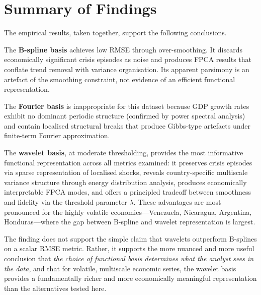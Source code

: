 \section{Summary of Findings}
\label{sec:summary}

The empirical results, taken together, support the following conclusions.

The \textbf{B-spline basis} achieves low RMSE through over-smoothing. It discards
economically significant crisis episodes as noise and produces FPCA results that
conflate trend removal with variance organisation. Its apparent parsimony is an
artefact of the smoothing constraint, not evidence of an efficient functional
representation.

The \textbf{Fourier basis} is inappropriate for this dataset because GDP growth
rates exhibit no dominant periodic structure (confirmed by power spectral
analysis) and contain localised structural breaks that produce Gibbs-type
artefacts under finite-term Fourier approximation.

The \textbf{wavelet basis}, at moderate thresholding, provides the most
informative functional representation across all metrics examined: it preserves
crisis episodes via sparse representation of localised shocks, reveals
country-specific multiscale variance structure through energy distribution
analysis, produces economically interpretable FPCA modes, and offers a principled
tradeoff between smoothness and fidelity via the threshold parameter $\lambda$.
These advantages are most pronounced for the highly volatile economies---Venezuela,
Nicaragua, Argentina, Honduras---where the gap between B-spline and wavelet
representation is largest.

The finding does not support the simple claim that wavelets outperform B-splines
on a scalar RMSE metric. Rather, it supports the more nuanced and more useful
conclusion that \emph{the choice of functional basis determines what the analyst
sees in the data}, and that for volatile, multiscale economic series, the wavelet
basis provides a fundamentally richer and more economically meaningful
representation than the alternatives tested here.